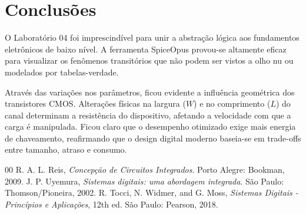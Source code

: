 \documentclass[conference]{IEEEtran}
\begin{document}
\section{Conclusões}
O Laboratório 04 foi imprescindível para unir a abstração lógica aos fundamentos eletrônicos de baixo nível. A ferramenta SpiceOpus provou-se altamente eficaz para visualizar os fenômenos transitórios que não podem ser vistos a olho nu ou modelados por tabelas-verdade.

Através das variações nos parâmetros, ficou evidente a influência geométrica dos transistores CMOS. Alterações físicas na largura ($W$) e no comprimento ($L$) do canal determinam a resistência do dispositivo, afetando a velocidade com que a carga é manipulada. Ficou claro que o desempenho otimizado exige mais energia de chaveamento, reafirmando que o design digital moderno baseia-se em trade-offs entre tamanho, atraso e consumo.

\begin{thebibliography}{00}
 R. A. L. Reis, \textit{Concepção de Circuitos Integrados}. Porto Alegre: Bookman, 2009.
 J. P. Uyemura, \textit{Sistemas digitais: uma abordagem integrada}. São Paulo: Thomson/Pioneira, 2002.
 R. Tocci, N. Widmer, and G. Moss, \textit{Sistemas Digitais - Princípios e Aplicações}, 12th ed. São Paulo: Pearson, 2018.
\end{thebibliography}
\end{document}
